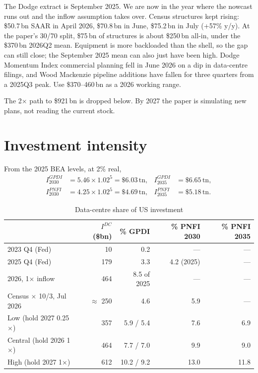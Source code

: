 \documentclass[11pt]{article}
\begin{document}
The Dodge extract is September 2025. We are now in the year where the nowcast
runs out and the inflow assumption takes over. Census structures kept rising:
\$50.7\,bn SAAR in April 2026, \$70.8\,bn in June, \$75.2\,bn in July
(+57\% y/y). At the paper's 30/70 split, \$75\,bn of structures is about
\$250\,bn all-in, under the \$370\,bn 2026Q2 mean. Equipment is more
backloaded than the shell, so the gap can still close; the September 2025
mean can also just have been high. Dodge Momentum Index commercial planning
fell in June 2026 on a dip in data-centre filings, and Wood Mackenzie pipeline
additions have fallen for three quarters from a 2025Q3 peak. Use
\$370--460\,bn as a 2026 working range.

The 2$\times$ path to \$921\,bn is dropped below. By 2027 the paper is
simulating new plans, not reading the current stock.

\section{Investment intensity}

From the 2025 BEA levels, at 2\% real,
\begin{equation}
\begin{aligned}
I_{2030}^{GPDI} &= 5.46\times 1.02^{5}=\$6.03\,\text{tn}, &
I_{2035}^{GPDI} &= \$6.65\,\text{tn},\\
I_{2030}^{PNFI} &= 4.25\times 1.02^{5}=\$4.69\,\text{tn}, &
I_{2035}^{PNFI} &= \$5.18\,\text{tn}.
\end{aligned}
\end{equation}

\begin{table}[H]
\centering
\small
\caption{Data-centre share of US investment}
\label{tab:inv}
\begin{tabular}{lrrrr}
\toprule
 & $I^{DC}$ (\$bn) & \% GPDI & \% PNFI 2030 & \% PNFI 2035 \\
\midrule
2023 Q4 (Fed) & 10 & 0.2 & --- & --- \\
2025 Q4 (Fed) & 179 & 3.3 & 4.2 (2025) & --- \\
2026, 1$\times$ inflow & 464 & 8.5 of 2025 & --- & --- \\
Census $\times$ 10/3, Jul 2026 & $\approx$ 250 & 4.6 & 5.9 & --- \\
\addlinespace
Low (hold 2027 0.25$\times$) & 357 & 5.9 / 5.4 & 7.6 & 6.9 \\
Central (hold 2026 1$\times$) & 464 & 7.7 / 7.0 & 9.9 & 9.0 \\
High (hold 2027 1$\times$) & 612 & 10.2 / 9.2 & 13.0 & 11.8 \\
\bottomrule
\end{tabular}
\end{table}
\end{document}
